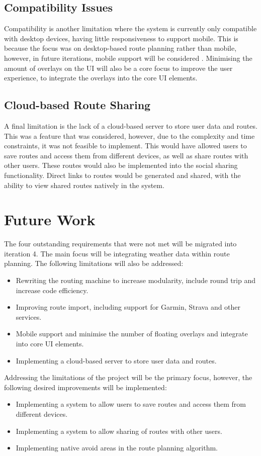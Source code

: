 \subsection{Compatibility Issues}
Compatibility is another limitation where the system is currently only compatible with desktop devices, having little responsiveness to support mobile. This is because the focus was on desktop-based route planning rather than mobile, however, in future iterations, mobile support will be considered . Minimising the amount of overlays on the UI will also be a core focus to improve the user experience, to integrate the overlays into the core UI elements.

\subsection{Cloud-based Route Sharing}
A final limitation is the lack of a cloud-based server to store user data and routes. This was a feature that was considered, however, due to the complexity and time constraints, it was not feasible to implement. This would have allowed users to save routes and access them from different devices, as well as share routes with other users. These routes would also be implemented into the social sharing functionality. Direct links to routes would be generated and shared, with the ability to view shared routes natively in the system.

\section{Future Work}
\label{evaluation:future}

The four outstanding requirements that were not met will be migrated into iteration 4. The main focus will be integrating weather data within route planning. The following limitations will also be addressed:
\begin{itemize}
    \item Rewriting the routing machine to increase modularity, include round trip and increase code efficiency.
    \item Improving route import, including support for Garmin, Strava and other services.
    \item Mobile support and minimise the number of floating overlays and integrate into core UI elements.
    \item Implementing a cloud-based server to store user data and routes.
\end{itemize}
Addressing the limitations of the project will be the primary focus, however, the following desired improvements will be implemented:
\begin{itemize}
    \item Implementing a system to allow users to save routes and access them from different devices.
    \item Implementing a system to allow sharing of routes with other users.
    \item Implementing native avoid areas in the route planning algorithm.
\end{itemize}

